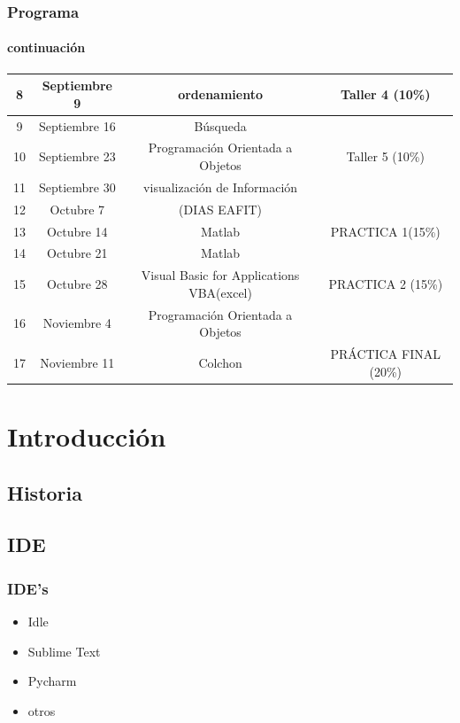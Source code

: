 \documentclass[xcolor=svgnames]{beamer}
\theoremstyle{example}
\begin{document}
\begin{frame}
  \frametitle{Programa}
   \framesubtitle{continuación}
 \begin{tiny}
\begin{tabular}{|c|c|c|c|}
  \hline



8
& Septiembre 9
& ordenamiento
& Taller 4 (10\%)
\\ \hline
9
& Septiembre 16
& Búsqueda
&
\\ \hline
10
& Septiembre 23
& Programación Orientada a Objetos
& Taller 5 (10\%)
\\ \hline
11
& Septiembre 30
& visualización de Información
& 
\\ \hline
12
& Octubre 7
&(DIAS EAFIT)
& 
\\ \hline
13
& Octubre 14
& Matlab
& PRACTICA 1(15\%)
\\ \hline
14
& Octubre 21
& Matlab
& 
\\ \hline
15
& Octubre 28
& Visual Basic for Applications VBA(excel)
& PRACTICA 2 (15\%)
\\ \hline
16
& Noviembre 4
& Programación Orientada a Objetos
& 
\\ \hline
17
& Noviembre 11
& Colchon
& PRÁCTICA FINAL (20\%)
\\ \hline
\end{tabular}
\end{tiny}
\end{frame}


\section{Introducción}


\subsection{Historia}

\subsection{IDE}

\begin{frame}
  \frametitle{IDE's}
  \begin{itemize}
    \item Idle
    \item Sublime Text
    \item Pycharm
    \item otros
  \end{itemize}
\end{frame}
\end{document}
